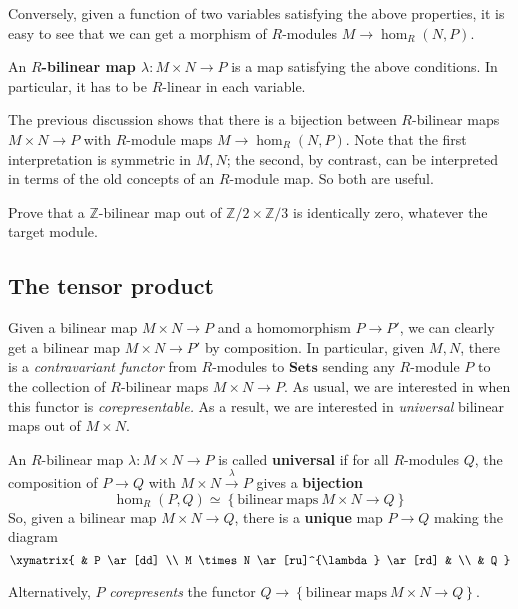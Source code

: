 Conversely, given a function of two variables satisfying the above properties,
it is easy to see that we can get a morphism of $R$-modules $M \to \hom_R(N,P)$.



\begin{definition} 
An \textbf{$R$-bilinear map $\lambda: M \times N \to P$} is a map satisfying
the above conditions. In particular, it has to be $R$-linear in each variable.
\end{definition} 

The previous discussion shows that there is a bijection between $R$-bilinear
maps $M \times N \to P$ with $R$-module maps $M \to \hom_R(N,P)$. 
Note that the first interpretation is symmetric in $M,N$; the second, by
contrast, can be interpreted in terms of the old concepts of an $R$-module map.
So both are useful.

\begin{exercise} 
Prove that a $\mathbb{Z}$-bilinear map out of $\mathbb{Z}/2 \times
\mathbb{Z}/3$ is identically zero, whatever the target module.
\end{exercise} 

\subsection{The tensor product}
Given a bilinear map $M \times N \to P$ and a homomorphism $P \to P'$, we can
clearly get a bilinear map $M \times N \to P'$ by composition. 
In particular, given $M,N$, there is a \emph{contravariant functor} from $R$-modules to
$\mathbf{Sets}$ sending  any $R$-module $P$ to the collection of $R$-bilinear maps $M \times N
\to P$. As usual, we are interested in when this functor is
\emph{corepresentable.}
As  a result,
we are interested in \emph{universal} bilinear maps out of $M \times N$.


\begin{definition} 
An $R$-bilinear map $\lambda: M \times N \to P$ is called \textbf{universal} if
for all $R$-modules $Q$, the composition of $P \to Q$ with $M \times N
\stackrel{\lambda}{\to} P$
gives a \textbf{bijection}
\[ \hom_R(P,Q) \simeq \left\{\mathrm{bilinear \ maps} \ M \times N \to Q\right\}  \]
So, given a bilinear map $M \times N \to Q$, there is a \textbf{unique} map $P
\to Q$ making the diagram 
\[ 
\xymatrix{
& P \ar[dd] \\
M \times N \ar[ru]^{\lambda} \ar[rd] & \\
& Q 
}
\]

Alternatively, $P$ \emph{corepresents} the functor $Q \to
\left\{\mathrm{bilinear \ maps \ } M \times N \to Q\right\}$.
\end{definition} 

